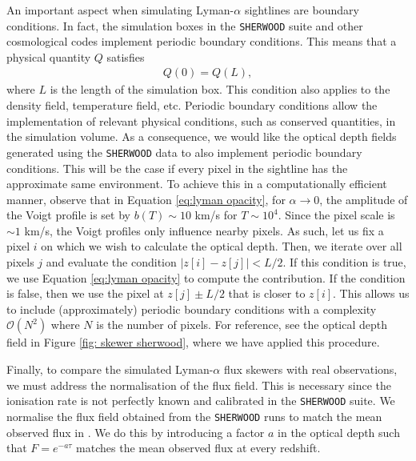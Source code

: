 An important aspect when simulating Lyman-$\alpha$ sightlines are boundary conditions. In fact, the simulation boxes in the \texttt{SHERWOOD} suite and other cosmological codes implement periodic boundary conditions. This means that a physical quantity $Q$ satisfies
\begin{eqnarray}
        Q(0)=Q(L),
\end{eqnarray}
where $L$ is the length of the simulation box. This condition also applies to the density field, temperature field, etc. Periodic boundary conditions allow the implementation of relevant physical conditions, such as conserved quantities, in the simulation volume. As a consequence, we would like the optical depth fields generated using the \texttt{SHERWOOD} data to also implement periodic boundary conditions. This will be the case if every pixel in the sightline has the approximate same environment. To achieve this in a computationally efficient manner, observe that in Equation \ref{eq:lyman opacity}, for $\alpha\to 0$, the amplitude of the Voigt profile is set by $b(T)\sim 10$ km/s for $T\sim 10^4$. Since the pixel scale is $\sim 1$ km/s, the Voigt profiles only influence nearby pixels. As such, let us fix a pixel $i$ on which we wish to calculate the optical depth. Then, we iterate over all pixels $j$ and evaluate the condition $|z[i]-z[j]| < L/2$. If this condition is true, we use Equation \ref{eq:lyman opacity} to compute the contribution. If the condition is false, then we use the pixel at $z[j]\pm L/2$ that is closer to $z[i]$. This allows us to include (approximately) periodic boundary conditions with a complexity $\mathcal{O}(N^2)$ where $N$ is the number of pixels. For reference, see the optical depth field in Figure \ref{fig: skewer sherwood}, where we have applied this procedure.

Finally, to compare the simulated Lyman-$\alpha$ flux skewers with real observations, we must address the normalisation of the flux field. This is necessary since the ionisation rate is not perfectly known and calibrated in the \texttt{SHERWOOD} suite. We normalise the flux field obtained from the \texttt{SHERWOOD} runs to match the mean observed flux in \cite{Becker_mean_flux}. We do this by introducing a factor $a$ in the optical depth such that $F=e^{-a\tau}$ matches the mean observed flux at every redshift.



